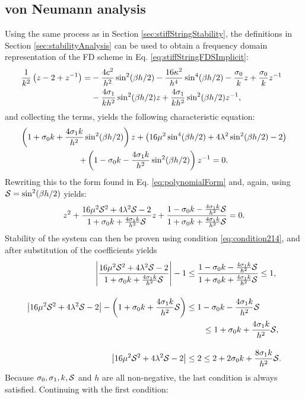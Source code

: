 {\subsection{von Neumann analysis}
Using the same process as in Section \ref{sec:stiffStringStability}, the definitions in Section \ref{sec:stabilityAnalysis} can be used to obtain a frequency domain representation of the FD scheme in Eq. \eqref{eq:stiffStringFDSImplicit}:
\begin{align}
    \!\!\!\!\frac{1}{k^2}\left(z - 2 + z^{-1}\right) =&-\frac{4c^2}{h^2}\sin^2(\beta h/2) - \frac{16\kappa^2}{h^4}\sin^4(\beta h/2) - \frac{\sz}{k}z + \frac{\sz}{k} z^{-1}\nonumber\\
    & - \frac{4 \so}{kh^2}\sin^2(\beta h/2)z + \frac{4 \so}{kh^2} \sin^2(\beta h/2)z^{-1},
\end{align}
and collecting the terms, yields the following characteristic equation:
\begin{gather}
\left(1+\sz k + \frac{4\so k}{h^2}\sin^2(\beta h/2)\right)z + \left(16\mu^2\sin^4(\beta h/2)+4\lambda^2\sin^2(\beta h/2) - 2\right)\nonumber\\
+ \left(1-\sz k - \frac{4\so k}{h^2}\sin^2(\beta h/2)\right)z^{-1} = 0.\label{eq:charDampedStiffSTring}
\end{gather}
Rewriting this to the form found in Eq. \eqref{eq:polynomialForm} and, again, using $\S = \sin^2(\beta h / 2)$ yields:
\begin{equation*}
z^2 + \frac{16\mu^2\S^2+4\lambda^2\S - 2}{1+\sz k + \frac{4\so k}{h^2}\S}z+\frac{1-\sz k - \frac{4\so k}{h^2}\S}{1+\sz k + \frac{4\so k}{h^2}\S} = 0.
\end{equation*}
Stability of the system can then be proven using condition \eqref{eq:condition214}, and after substitution of the coefficients yields
\begin{align*}
\left|\frac{16\mu^2\S^2+4\lambda^2\S - 2}{1+\sz k + \frac{4\so k}{h^2}\S} \right|-1 &\leq \frac{1-\sz k - \frac{4\so k}{h^2}\S}{1+\sz k + \frac{4\so k}{h^2}\S}\leq 1,\\[1em]
\left|16\mu^2\S^2+4\lambda^2\S - 2 \right| - \left(1+\sz k + \frac{4\so k}{h^2}\S\right) &\leq 1-\sz k - \frac{4\so k}{h^2}\S\\
&\qquad\leq 1+\sz k + \frac{4\so k}{h^2}\S,\\[1em]
\left|16\mu^2\S^2+4\lambda^2\S - 2 \right|&\leq 2 \leq 2+2\sz k + \frac{8\so k}{h^2}\S.
\end{align*} 
Because $\sz, \so, k, \S$ and $h$ are all non-negative, the last condition is always satisfied. Continuing with the first condition:
}
